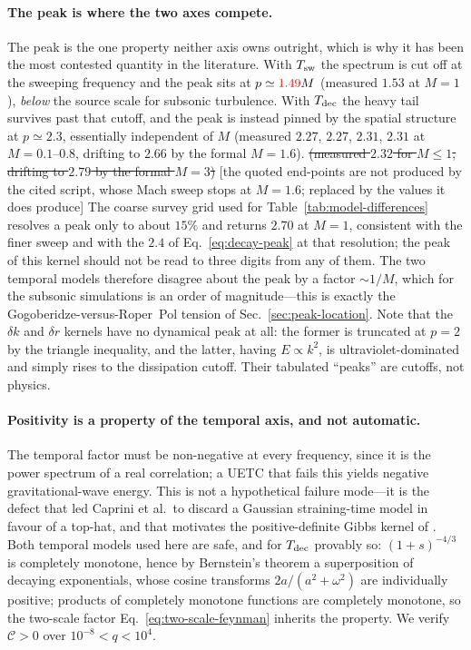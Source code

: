 \documentclass[10pt,prd,aps,nobibnotes,superscriptaddress,preprintnumbers,notitlepage]{revtex4-1}
\newcommand{\add}[1]{{\color{red}#1}}
\newcommand{\del}[1]{{\color{red}\sout{#1}}}
\newcommand{\why}[1]{{\color{red}\footnotesize\textsf{[#1]}}}
\newcommand{\add}[1]{#1}
\newcommand{\del}[1]{}
\newcommand{\why}[1]{}
\begin{document}
\paragraph{The peak is where the two axes compete.}
The peak is the one property neither axis owns outright, which is why it has
been the most contested quantity in the literature. With $T_{\rm sw}$ the
spectrum is cut off at the sweeping frequency and the peak sits at
$p\simeq\add{1.49}M$ (measured $1.53$ at $M=1$), \emph{below} the source scale for
subsonic turbulence. With $T_{\rm dec}$ the heavy tail survives past that
cutoff, and the peak is instead pinned by the spatial structure at
$p\simeq2.3$, essentially independent of $M$ \add{(measured $2.27$, $2.27$, $2.31$,
$2.31$ at $M=0.1$--$0.8$, drifting to $2.66$ by the formal $M=1.6$)}.
\del{(measured $2.32$ for $M\le1$, drifting to $2.79$ by the formal $M=3$)}
\why{the quoted end-points are not produced by the cited script, whose Mach sweep
stops at $M=1.6$; replaced by the values it does produce}
\add{The coarse survey grid used for Table~\ref{tab:model-differences} resolves a
peak only to about $15\%$ and returns $2.70$ at $M=1$, consistent with the finer
sweep and with the $2.4$ of Eq.~\eqref{eq:decay-peak} at that resolution; the peak of
this kernel should not be read to three digits from any of them.}
The two temporal models therefore
disagree about the peak by a factor $\sim1/M$, which for the subsonic
simulations is an order of magnitude---this is exactly the
Gogoberidze-versus-Roper~Pol tension of Sec.~\ref{sec:peak-location}. Note that
the $\delta k$ and $\delta r$ kernels have no dynamical peak at all: the former
is truncated at $p=2$ by the triangle inequality, and the latter, having
$E\propto k^{2}$, is ultraviolet-dominated and simply rises to the dissipation
cutoff. Their tabulated ``peaks'' are cutoffs, not physics.

\paragraph{Positivity is a property of the temporal axis, and not automatic.}
The temporal factor must be non-negative at every frequency, since it is the
power spectrum of a real correlation; a UETC that fails this yields negative
gravitational-wave energy. This is not a hypothetical failure mode---it is the
defect that led Caprini et al.\ to discard a Gaussian straining-time model in
favour of a top-hat, and that motivates the positive-definite Gibbs kernel of
\cite{Auclair:2022jod}. Both temporal models used here are safe, and for
$T_{\rm dec}$ provably so: $(1+s)^{-4/3}$ is completely monotone, hence by
Bernstein's theorem a superposition of decaying exponentials, whose cosine
transforms $2a/(a^{2}+\omega^{2})$ are individually positive; products of
completely monotone functions are completely monotone, so the two-scale factor
Eq.~\eqref{eq:two-scale-feynman} inherits the property. We verify
$\mathcal{C}>0$ over $10^{-8}<q<10^{4}$.
\end{document}
